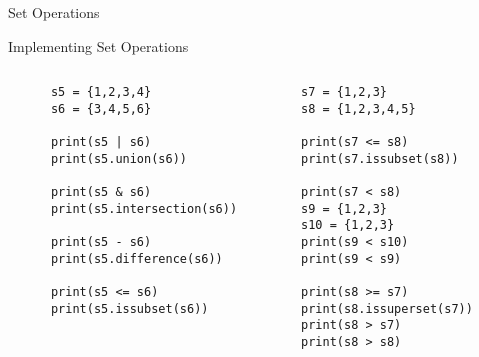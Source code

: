 \begin{frame}[fragile]{Set Operations}
  \begin{exercise}{Implementing Set Operations}
    \begin{columns}[t]
          \begin{lstlisting}
      s5 = {1,2,3,4}
      s6 = {3,4,5,6}

      print(s5 | s6)
      print(s5.union(s6))

      print(s5 & s6)
      print(s5.intersection(s6))
      
      print(s5 - s6)
      print(s5.difference(s6))

      print(s5 <= s6)
      print(s5.issubset(s6))
    \end{lstlisting}
    \begin{lstlisting}
      s7 = {1,2,3}
      s8 = {1,2,3,4,5}
      
      print(s7 <= s8)
      print(s7.issubset(s8))

      print(s7 < s8)
      s9 = {1,2,3}
      s10 = {1,2,3}
      print(s9 < s10)
      print(s9 < s9)

      print(s8 >= s7)
      print(s8.issuperset(s7))
      print(s8 > s7)
      print(s8 > s8)
    \end{lstlisting}
      
    \end{columns}
  \end{exercise}
\end{frame}
